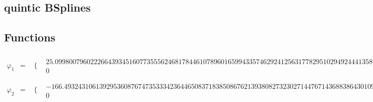 \documentclass{article}
\begin{document}
 

\begin{landscape}
\section{quintic BSplines}
\subsection{Functions}\begin{eqnarray*} \varphi_1 & = & \begin{array}{cc}
 \{ & 
\begin{array}{cc}
 25.09980079602226643934516077355562468178446107896016599433574629241256317782951029492444135894854608 x^4-50.19960159204453287869032154711124936356892215792033198867149258482512635565902058984888271789709217 x^3+25.09980079602226643934516077355562468178446107896016599433574629241256317782951029492444135894854608 x^2 & x\geq 0\land x<1 \\
 0 & \text{True}
\end{array}

\end{array}\\
\varphi_2 & = & \begin{array}{cc}
 \{ & 
\begin{array}{cc}
 -166.4932431061392953608767473533342364465083718385086762139380827323027144767143688386430109043323782 x^5+416.2331077653482384021918683833355911162709295962716905348452068307567861917859220966075272608309454 x^4-332.9864862122785907217534947066684728930167436770173524278761654646054289534287376772860218086647563 x^3+83.24662155306964768043837367666711822325418591925433810696904136615135723835718441932150545216618909 x^2 & x\geq 0\land x<1 \\
 0 & \text{True}
\end{array}


\end{array}
\end{eqnarray*}
\end{landscape}
\end{document}
